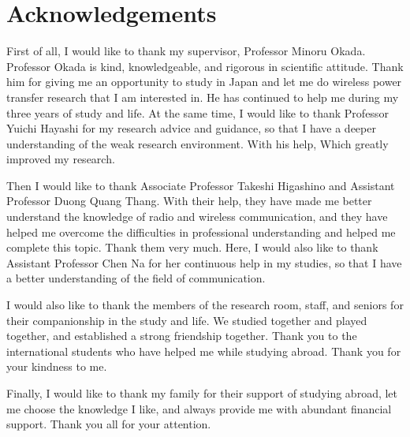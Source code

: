 \chapter*{Acknowledgements}
First of all, I would like to thank my supervisor, Professor Minoru Okada. Professor Okada is kind, knowledgeable, and rigorous in scientific attitude. Thank him for giving me an opportunity to study in Japan and let me do wireless power transfer research that I am interested in. He has continued to help me during my three years of study and life. At the same time, I would like to thank Professor Yuichi Hayashi for my research advice and guidance, so that I have a deeper understanding of the weak research environment. With his help, Which greatly improved my research.

Then I would like to thank Associate Professor Takeshi Higashino and Assistant Professor Duong Quang Thang. With their help, they have made me better understand the knowledge of radio and wireless communication, and they have helped me overcome the difficulties in professional understanding and helped me complete this topic. Thank them very much. Here, I would also like to thank Assistant Professor Chen Na for her continuous help in my studies, so that I have a better understanding of the field of communication.

I would also like to thank the members of the research room, staff, and seniors for their companionship in the study and life. We studied together and played together, and established a strong friendship together. Thank you to the international students who have helped me while studying abroad. Thank you for your kindness to me.

Finally, I would like to thank my family for their support of studying abroad, let me choose the knowledge I like, and always provide me with abundant financial support.
Thank you all for your attention.